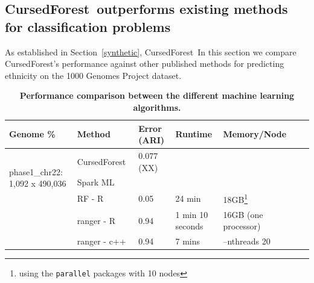 \documentclass[10pt,letterpaper]{article}
\newcommand{\cursedforest}{{\sc CursedForest}}
\begin{document}
\subsection{\cursedforest\ outperforms existing methods for classification problems}
As established in Section~\ref{synthetic}, \cursedforest\ 
In this section we compare \cursedforest 's performance against other published methods for predicting ethnicity on the
1000 Genomes Project dataset.


\begin{table}[!ht]
\begin{minipage}{\textwidth}
\begin{adjustwidth}{-2.25in}{0in} %
\centering
\caption{
{\bf Performance comparison between the different machine learning algorithms.}}
\begin{tabular}{|l|l|l|l|l|l|p{1cm}|}
\hline
\bf{Genome \%}                      & \bf{Method} & \bf{Error (ARI)} & \bf{Runtime} & \bf{Memory/Node} \\
\hline

\multirow{3}{*}{phase1\_chr22: 1,092 x 490,036} & \cursedforest\ & 0.077 (XX) &                  &                                                                   \\
                                                & Spark ML  &            &                  &                                                                   \\
                                                & RF - R         & 0.05       & 24 min           & 18GB\footnote{using the \texttt{parallel} packages with 10 nodes} \\
                                                & ranger - R      & 0.94       & 1 min 10 seconds & 16GB  (one processor)                                             \\
                                                & ranger - c++     & 0.94       & 7 mins           & --nthreads 20                                                     \\


\end{tabular}
\end{adjustwidth}
\end{minipage}
\end{table}
\end{document}
